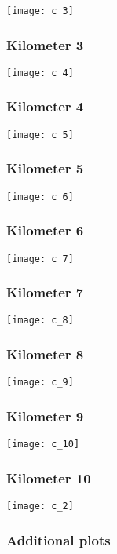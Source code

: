 \documentclass[]{article}
\begin{document}
\texttt{[image: c\_3]}

\subsubsection{Kilometer 3}\label{kilometer-3-2}

\texttt{[image: c\_4]}

\subsubsection{Kilometer 4}\label{kilometer-4-2}

\texttt{[image: c\_5]}

\subsubsection{Kilometer 5}\label{kilometer-5-2}

\texttt{[image: c\_6]}

\subsubsection{Kilometer 6}\label{kilometer-6-2}

\texttt{[image: c\_7]}

\subsubsection{Kilometer 7}\label{kilometer-7-1}

\texttt{[image: c\_8]}

\subsubsection{Kilometer 8}\label{kilometer-8}

\texttt{[image: c\_9]}

\subsubsection{Kilometer 9}\label{kilometer-9}

\texttt{[image: c\_10]}

\subsubsection{Kilometer 10}\label{kilometer-10}

\texttt{[image: c\_2]}

\subsubsection{Additional plots}\label{additional-plots-2}
\end{document}
